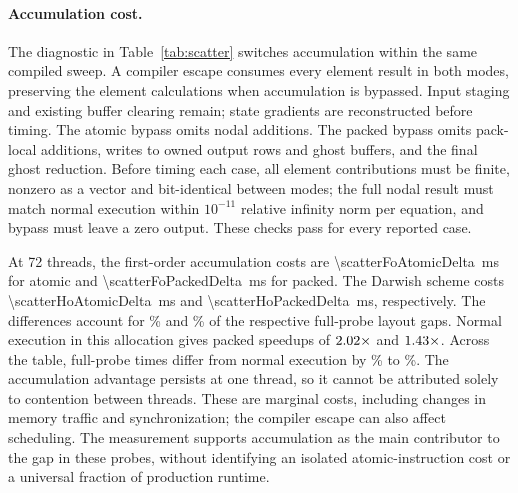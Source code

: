 \documentclass[sigconf,nonacm]{acmart}
\begin{document}
\paragraph{Accumulation cost.}
The diagnostic in Table~\ref{tab:scatter} switches accumulation within the same compiled
sweep. A compiler escape consumes every element result in both modes, preserving the
element calculations when accumulation is bypassed. Input staging and existing buffer
clearing remain; state gradients are reconstructed before timing. The atomic bypass omits
nodal additions. The packed bypass omits pack-local additions, writes to owned output rows
and ghost buffers, and the final ghost reduction. Before timing each case, all element contributions must be
finite, nonzero as a vector and bit-identical between modes; the full nodal result must
match normal execution within $10^{-11}$ relative infinity norm per equation, and bypass
must leave a zero output. These checks pass for every reported case.

At 72 threads, the first-order accumulation costs are
\SI{\scatterFoAtomicDelta}{\milli\second} for atomic and
\SI{\scatterFoPackedDelta}{\milli\second} for packed.
The Darwish scheme costs \SI{\scatterHoAtomicDelta}{\milli\second} and
\SI{\scatterHoPackedDelta}{\milli\second}, respectively. The differences account for
\scatterFoGapShare\% and \scatterHoGapShare\% of the respective full-probe layout gaps.
Normal execution in this allocation gives packed speedups of
$2.02\times$ and $1.43\times$.
Across the table, full-probe times differ from normal execution by
\scatterOverheadMin\% to \scatterOverheadMax\%.
The accumulation advantage persists at one thread, so it cannot be attributed solely
to contention between threads. These are marginal costs, including changes in memory
traffic and synchronization; the compiler escape can also affect scheduling. The
measurement supports accumulation as the main contributor to the gap in these probes,
without identifying an isolated atomic-instruction cost or a universal fraction of
production runtime.
\end{document}
